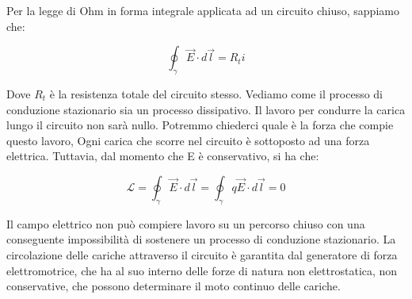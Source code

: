 Per la legge di Ohm in forma integrale applicata ad un circuito chiuso, sappiamo che:

\[
	\oint_{\gamma} \vec{E} \cdot d\vec{l} = R_t i
\]

Dove $ R_t  $ è la resistenza totale del circuito stesso. Vediamo come il processo di conduzione stazionario sia un processo dissipativo. Il lavoro per condurre la carica lungo il circuito non sarà nullo. Potremmo chiederci quale è la forza che compie questo lavoro, Ogni carica che scorre nel circuito è sottoposto ad una forza elettrica.
Tuttavia, dal momento che E è conservativo, si ha che:

\[
	\mathcal{L} =\oint_{\gamma} \vec{E} \cdot d\vec{l} = \oint_{\gamma} q\vec{E} \cdot d\vec{l} =0
\]

Il campo elettrico non può compiere lavoro su un percorso chiuso con una conseguente impossibilità di sostenere un processo di conduzione stazionario.
La circolazione delle cariche attraverso il circuito è garantita dal generatore di forza elettromotrice, che ha al suo interno delle forze di natura non elettrostatica, non conservative, che possono determinare il moto continuo delle cariche.

